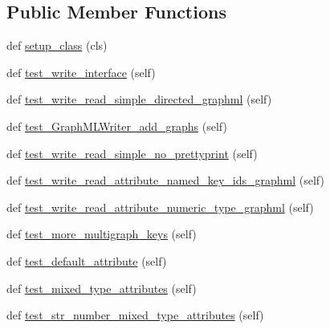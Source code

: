 \subsection*{Public Member Functions}
\begin{DoxyCompactItemize}
\item 
def \hyperlink{classnetworkx_1_1readwrite_1_1tests_1_1test__graphml_1_1TestWriteGraphML_ae8a87f992fc19d85b21fb19988eaaa88}{setup\+\_\+class} (cls)
\item 
def \hyperlink{classnetworkx_1_1readwrite_1_1tests_1_1test__graphml_1_1TestWriteGraphML_ac007fbb59484f70e7a51febf8a59a25c}{test\+\_\+write\+\_\+interface} (self)
\item 
def \hyperlink{classnetworkx_1_1readwrite_1_1tests_1_1test__graphml_1_1TestWriteGraphML_a81919af933e8840cb9675472bac9818e}{test\+\_\+write\+\_\+read\+\_\+simple\+\_\+directed\+\_\+graphml} (self)
\item 
def \hyperlink{classnetworkx_1_1readwrite_1_1tests_1_1test__graphml_1_1TestWriteGraphML_aa2a835a72b9c110302cef43096b0a4f0}{test\+\_\+\+Graph\+M\+L\+Writer\+\_\+add\+\_\+graphs} (self)
\item 
def \hyperlink{classnetworkx_1_1readwrite_1_1tests_1_1test__graphml_1_1TestWriteGraphML_a2d2f4e85cebe9481c8a9ea830beb8bab}{test\+\_\+write\+\_\+read\+\_\+simple\+\_\+no\+\_\+prettyprint} (self)
\item 
def \hyperlink{classnetworkx_1_1readwrite_1_1tests_1_1test__graphml_1_1TestWriteGraphML_ab78d460f865ac94b5b3cc1d083041f82}{test\+\_\+write\+\_\+read\+\_\+attribute\+\_\+named\+\_\+key\+\_\+ids\+\_\+graphml} (self)
\item 
def \hyperlink{classnetworkx_1_1readwrite_1_1tests_1_1test__graphml_1_1TestWriteGraphML_af1eaf487be742a61ca2e15385e60c0d8}{test\+\_\+write\+\_\+read\+\_\+attribute\+\_\+numeric\+\_\+type\+\_\+graphml} (self)
\item 
def \hyperlink{classnetworkx_1_1readwrite_1_1tests_1_1test__graphml_1_1TestWriteGraphML_a27536030caafb4ad93bd4bb64758fd7c}{test\+\_\+more\+\_\+multigraph\+\_\+keys} (self)
\item 
def \hyperlink{classnetworkx_1_1readwrite_1_1tests_1_1test__graphml_1_1TestWriteGraphML_aa3b20548a88ed3ff76f614074c99866d}{test\+\_\+default\+\_\+attribute} (self)
\item 
def \hyperlink{classnetworkx_1_1readwrite_1_1tests_1_1test__graphml_1_1TestWriteGraphML_a271b23187bd076a50eeba5772cbe33b0}{test\+\_\+mixed\+\_\+type\+\_\+attributes} (self)
\item 
def \hyperlink{classnetworkx_1_1readwrite_1_1tests_1_1test__graphml_1_1TestWriteGraphML_a3491345a52bb216916de93694d41da3d}{test\+\_\+str\+\_\+number\+\_\+mixed\+\_\+type\+\_\+attributes} (self)

\end{DoxyCompactItemize}
